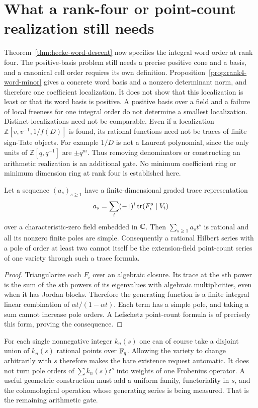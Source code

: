 \documentclass[11pt]{article}
\newcommand{\Z}{\mathbb Z}\newcommand{\N}{\mathbb N}\newcommand{\Q}{\mathbb Q}
\theoremstyle{definition}\newtheorem{definition}[theorem]{Definition}
\begin{document}
\section{What a rank-four or point-count realization still needs}\label{sec:open}
Theorem~\ref{thm:hecke-word-descent} now specifies the integral word order at rank four. The positive-basis problem still needs a precise positive cone and a basis, and a canonical cell order requires its own definition. Proposition~\ref{prop:rank4-word-minor} gives a concrete word basis and a nonzero determinant norm, and therefore one coefficient localization. It does not show that this localization is least or that its word basis is positive. A positive basis over a field and a failure of local freeness for one integral order do not determine a smallest localization. Distinct localizations need not be comparable. Even if a localization $\Z[v,v^{-1},1/f(D)]$ is found, its rational functions need not be traces of finite sign-Tate objects. For example $1/D$ is not a Laurent polynomial, since the only units of $\Z[q,q^{-1}]$ are $\pm q^m$. Thus removing denominators or constructing an arithmetic realization is an additional gate. No minimum coefficient ring or minimum dimension ring at rank four is established here.

\begin{proposition}\label{prop:poles}
Let a sequence $(a_s)_{s\ge1}$ have a finite-dimensional graded trace representation
\[
 a_s=\sum_i(-1)^i\operatorname{tr}(F_i^s\mid V_i)
\]
over a characteristic-zero field embedded in $\mathbb C$. Then $\sum_{s\ge1}a_st^s$ is rational and all its nonzero finite poles are simple. Consequently a rational Hilbert series with a pole of order at least two cannot itself be the extension-field point-count series of one variety through such a trace formula.
\end{proposition}
\begin{proof}
Triangularize each $F_i$ over an algebraic closure. Its trace at the $s$th power is the sum of the $s$th powers of its eigenvalues with algebraic multiplicities, even when it has Jordan blocks. Therefore the generating function is a finite integral linear combination of $\alpha t/(1-\alpha t)$. Each term has a simple pole, and taking a sum cannot increase pole orders. A Lefschetz point-count formula is of precisely this form, proving the consequence.
\end{proof}

For each single nonnegative integer $k_n(s)$ one can of course take a disjoint union of $k_n(s)$ rational points over $\mathbb F_q$. Allowing the variety to change arbitrarily with $s$ therefore makes the bare existence request automatic. It does not turn pole orders of $\sum k_n(s)t^s$ into weights of one Frobenius operator. A useful geometric construction must add a uniform family, functoriality in $s$, and the cohomological operation whose generating series is being measured. That is the remaining arithmetic gate.
\end{document}
